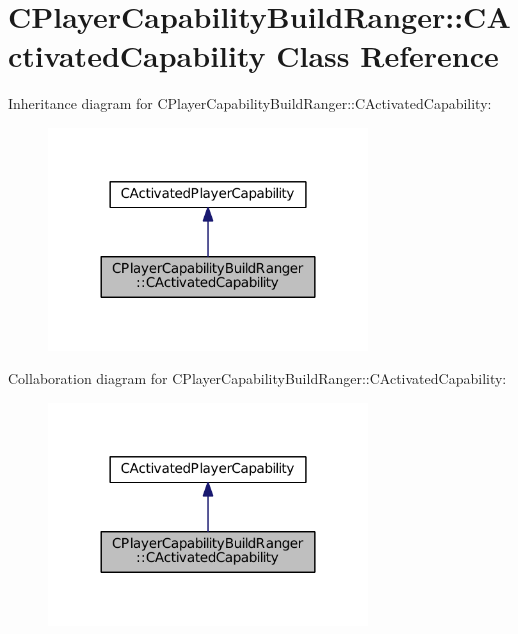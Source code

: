 \hypertarget{classCPlayerCapabilityBuildRanger_1_1CActivatedCapability}{}\section{C\+Player\+Capability\+Build\+Ranger\+:\+:C\+Activated\+Capability Class Reference}
\label{classCPlayerCapabilityBuildRanger_1_1CActivatedCapability}


Inheritance diagram for C\+Player\+Capability\+Build\+Ranger\+:\+:C\+Activated\+Capability\+:\nopagebreak
\begin{figure}[H]
\begin{center}
\leavevmode
\includegraphics[width=240pt]{classCPlayerCapabilityBuildRanger_1_1CActivatedCapability__inherit__graph}
\end{center}
\end{figure}


Collaboration diagram for C\+Player\+Capability\+Build\+Ranger\+:\+:C\+Activated\+Capability\+:\nopagebreak
\begin{figure}[H]
\begin{center}
\leavevmode
\includegraphics[width=240pt]{classCPlayerCapabilityBuildRanger_1_1CActivatedCapability__coll__graph}
\end{center}
\end{figure}
